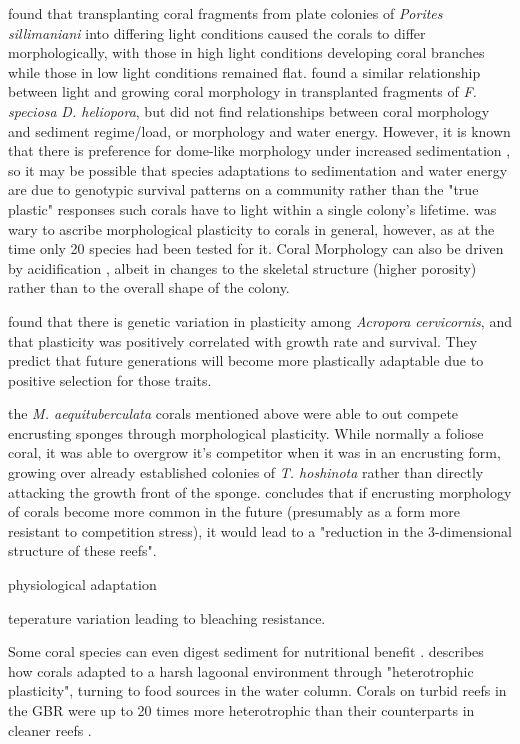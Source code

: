 \documentclass[11pt,a4paper]{article}
\begin{document}
\cite{Muko2000} found that transplanting coral fragments from plate colonies of \textit{Porites sillimaniani} into differing light conditions caused the corals to differ morphologically, with those in high light conditions developing coral branches while those in low light conditions remained flat.
 \cite{Todd2004} found a similar relationship between light and growing coral morphology in transplanted fragments of \textit{F. speciosa} \textit{D. heliopora}, but did not find relationships between coral morphology and sediment regime/load, or morphology and water energy.
  However, it is known that there is preference for dome-like morphology under increased sedimentation \citep{Stafford1992}, so it may be possible that species adaptations to sedimentation and water energy are due to genotypic survival patterns on a community rather than the "true plastic" responses such corals have to light within a single colony's lifetime.
   \cite{Todd2008} was wary to ascribe morphological plasticity to corals in general, however, as at the time only 20 species had been tested for it. Coral Morphology can also be driven by acidification \citep{Tambutte2015,Alison2022}, albeit in changes to the skeletal structure (higher porosity) rather than to the overall shape of the colony.

\cite{Million} found that there is genetic variation in plasticity among \textit{Acropora cervicornis}, and that plasticity was positively correlated with growth rate and survival. They predict that future generations will become more plastically adaptable due to positive selection for those traits. 

the \textit{M. aequituberculata} corals mentioned above \citep{Elliot2016} were able to out compete encrusting sponges through morphological plasticity. While normally a foliose coral, it was able to overgrow it's competitor when it was in an encrusting form, growing over already established colonies of \textit{T. hoshinota} rather than directly attacking the growth front of the sponge. \cite{Elliot2016} concludes that if encrusting morphology of corals become more common in the future (presumably as a form more resistant to competition stress), it would lead to a "reduction in the 3-dimensional structure of these reefs".

\cite{Hennige2008} physiological adaptation

\cite{Safaie2018} teperature variation leading to bleaching resistance.



Some coral species can even digest sediment for nutritional benefit \citep{Rosenfeld1999}. \cite{Camp2017} describes how corals  adapted to a harsh lagoonal environment through "heterotrophic plasticity", turning to food sources in the water column. Corals on turbid reefs in the GBR were up to 20 times more heterotrophic than their counterparts in cleaner reefs \citep{Anthony2000}.
\end{document}
